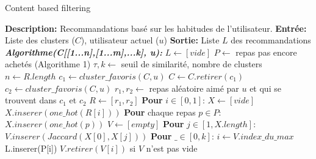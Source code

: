 \documentclass[11pt]{article}
\begin{document}
\begin{algorithm}
    \caption{Content based filtering}
    \begin{algorithmic}[1]
        \Statex \textbf{Description:} Recommandations basé sur les habitudes de l'utilisateur.
        \Statex \textbf{Entrée:} Liste des clusters ($C$), utilisateur actuel ($u$)
        \Statex \textbf{Sortie:} Liste $L$ des recommandations
        \State \textbf{\textit{Algorithme(C[[1...n],[1...m],...k], u):}}
        \State \hspace{0.5cm} $L \leftarrow [vide]$
        \State \hspace{0.5cm} $P \leftarrow$ repas pas encore achetés (Algorithme 1)
        \State \hspace{0.5cm} $\tau,k \leftarrow$ seuil de similarité, nombre de clusters
        \State \hspace{0.5cm} $n \leftarrow R.length$
        \State \hspace{0.5cm} $c_1 \leftarrow cluster\_favoris(C, u)$
        \State \hspace{0.5cm} $C \leftarrow C.retirer(c_1)$
        \State \hspace{0.5cm} $c_2 \leftarrow cluster\_favoris(C, u)$
        \State \hspace{0.5cm} $r_1, r_2 \leftarrow$ repas aléatoire aimé par $u$ et qui se trouvent dans $c_1$ et $c_2$
        \State \hspace{0.5cm} $R \leftarrow [r_1, r_2]$
        \State \hspace{0.5cm} \textbf{Pour} $i \in [0,1]$:
        \State \hspace{1cm} $X \leftarrow [vide]$ 
        \State \hspace{1cm} $X.inserer(one\_hot(R[i]))$
        \State \hspace{1cm} \textbf{Pour} chaque repas $p \in P$:
        \State \hspace{1.5cm} $X.inserer(one\_hot(p))$
        \State \hspace{1cm} $V \leftarrow [empty]$
        \State \hspace{1cm} \textbf{Pour} $j \in [1, X.length]$:
        \State \hspace{1.5cm} $V.inserer(Jaccard(X[0], X[j]))$
        \State \hspace{1cm} \textbf{Pour} $\_ \in [0, k]$:
        \State \hspace{1.5cm} $i \leftarrow V.index\_du\_max$
        \State \hspace{1.5cm} L.inserer(P[i])
        \State \hspace{1.5cm} $V.retirer(V[i])$ si $V$ n'est pas vide

\end{algorithmic}
\end{algorithm}
\end{document}
